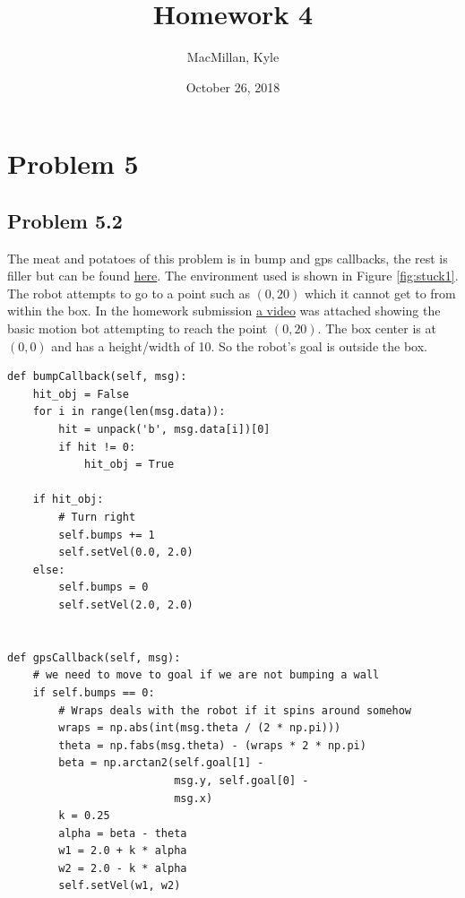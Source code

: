 \documentclass{article}
\title{\textbf{Homework 4}}
\author{MacMillan, Kyle}
\date{October 26, 2018}
\begin{document}
\maketitle

\newpage
\tableofcontents
{}
\newpage
\listoffigures
{}



\newpage
\hypersetup{
    colorlinks,
    citecolor=blue,
    filecolor=black,
    linkcolor=blue,
    urlcolor=blue
}

\setcounter{page}{1}
\newpage
\section{\textbf{Problem 5}}
\subsection{Problem 5.2}
The meat and potatoes of this problem is in bump and gps callbacks, the 
rest is filler but can be found \href{https://github.com/macattackftw/RoboticsHW/blob/master/HW4/Problem2.py}{here}. 
The environment used is shown in Figure \ref{fig:stuck1}. The robot attempts to 
go to a point such as $(0, 20)$ which it cannot get to from within the box. In 
the homework submission 
\href{https://drive.google.com/file/d/1aIZrLAZmhegsDObLa45E5CK3efqtNHIW/view?usp=sharing}{a video} 
was attached showing the basic motion bot attempting to reach the point 
$(0, 20)$. The box center is at $(0, 0)$ and has a height/width of 10. So the 
robot's goal is outside the box.

\begin{verbatim}
def bumpCallback(self, msg):
    hit_obj = False
    for i in range(len(msg.data)):
        hit = unpack('b', msg.data[i])[0]
        if hit != 0:
            hit_obj = True

    if hit_obj:
        # Turn right
        self.bumps += 1
        self.setVel(0.0, 2.0)
    else:
        self.bumps = 0
        self.setVel(2.0, 2.0)


def gpsCallback(self, msg):
    # we need to move to goal if we are not bumping a wall
    if self.bumps == 0:
        # Wraps deals with the robot if it spins around somehow
        wraps = np.abs(int(msg.theta / (2 * np.pi)))
        theta = np.fabs(msg.theta) - (wraps * 2 * np.pi)
        beta = np.arctan2(self.goal[1] -
                          msg.y, self.goal[0] -
                          msg.x)
        k = 0.25
        alpha = beta - theta
        w1 = 2.0 + k * alpha
        w2 = 2.0 - k * alpha
        self.setVel(w1, w2)

\end{verbatim}
\end{document}
